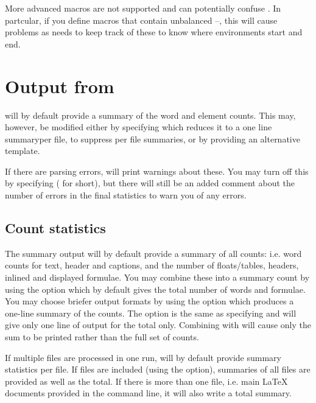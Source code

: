 \documentclass{article}
\begin{document}
More advanced macros are not supported and can potentially confuse \TeXcount{}. In partcular, if you define macros that contain unbalanced --, this will cause problems as \TeXcount{} needs to keep track of these to know where environments start and end.




\section{Output from \TeXcount{}}

\TeXcount{} will by default provide a summary of the word and element counts. This may, however, be modified either by specifying  which reduces it to a one line summaryper file,  to suppress per file summaries, or by providing an alternative template.

If there are parsing errors, \TeXcount{} will print warnings about these. You may turn off this by specifying  ( for short), but there will still be an added comment about the number of errors in the final statistics to warn you of any errors.


\subsection{Count statistics}

The summary output will by default provide a summary of all counts: i.e. word counts for text, header and captions, and the number of floats/tables, headers, inlined and displayed formulae. You may combine these into a summary count by using the  option which by default gives the total number of words and formulae. You may choose briefer output formats by using the  option which produces a one-line summary of the counts. The option  is the same as specifying  and will give only one line of output for the total only. Combining  with  will cause only the sum to be printed rather than the full set of counts.

If multiple files are processed in one run, \TeXcount{} will by default provide summary statistics per file. If files are included (using the  option), summaries of all files are provided as well as the total. If there is more than one file, i.e. main \LaTeX{} documents provided in the command line, it will also write a total summary.
\end{document}
